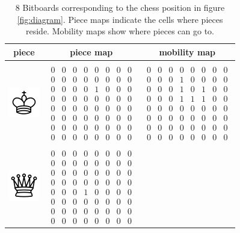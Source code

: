 \documentclass[twocolumn]{phdsymp} %
\begin{document}
\begin{table}[]
\caption{8 Bitboards corresponding to the chess position in figure \ref{fig:diagram}. Piece maps indicate the cells where pieces reside. Mobility maps show where pieces can go to.}
\label{tab:feat}
\centering
\begin{tabular}{c c c}
\hline
\textbf{piece} & \textbf{piece map} & \textbf{mobility map}  \\
\hline
&&\\
\includegraphics[scale=0.5]{pieces/K} & 
$\begin{smallmatrix}0&0&0&0&0&0&0&0\\0&0&0&0&0&0&0&0\\0&0&0&0&1&0&0&0\\0&0&0&0&0&0&0&0\\0&0&0&0&0&0&0&0\\0&0&0&0&0&0&0&0\\0&0&0&0&0&0&0&0\\0&0&0&0&0&0&0&0\end{smallmatrix}$
&
$\begin{smallmatrix}0&0&0&0&0&0&0&0\\0&0&0&1&0&0&0&0\\0&0&0&1&0&1&0&0\\0&0&0&1&1&1&0&0\\0&0&0&0&0&0&0&0\\0&0&0&0&0&0&0&0\\0&0&0&0&0&0&0&0\\0&0&0&0&0&0&0&0\end{smallmatrix}$
\\&&\\
\includegraphics[scale=0.5]{pieces/Q} & 
$\begin{smallmatrix}0&0&0&0&0&0&0&0\\0&0&0&0&0&0&0&0\\0&0&0&0&0&0&0&0\\0&0&0&0&0&0&0&0\\0&0&0&1&0&0&0&0\\0&0&0&0&0&0&0&0\\0&0&0&0&0&0&0&0\\0&0&0&0&0&0&0&0\end{smallmatrix}$

\end{tabular}
\end{table}
\end{document}
